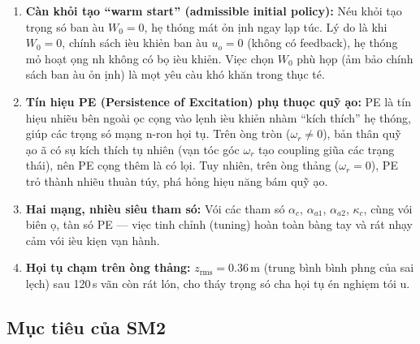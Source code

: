 \documentclass[12pt,a4paper]{article}
\begin{document}
\begin{enumerate}
    \item \textbf{C\`{a}n kh\h{o}i t\d{a}o ``warm start'' (admissible initial policy):} N\'{e}u kh\h{o}i t\d{a}o tr\d{o}ng s\'{o} ban \dj\`{a}u $W_0 = 0$, h\d{e} th\'{o}ng m\'{a}t \h{o}n \dj\d{i}nh ngay l\d{a}p t\'{u}c. L\'{y} do l\`{a} khi $W_0 = 0$, ch\'{i}nh s\'{a}ch \dj i\`{e}u khi\h{e}n ban \dj\`{a}u $u_o = 0$ (kh\^{o}ng c\'{o} feedback), h\d{e} th\'{o}ng m\h{o} ho\d{a}t \dj\d{o}ng nh\uhorn{} kh\^{o}ng c\'{o} b\d{o} \dj i\`{e}u khi\h{e}n. Vi\d{e}c ch\d{o}n $W_0$ ph\`{u} h\d{o}p (\dj\h{a}m b\h{a}o ch\'{i}nh s\'{a}ch ban \dj\`{a}u \h{o}n \dj\d{i}nh) l\`{a} m\d{o}t y\^{e}u c\`{a}u kh\'{o} kh\u{a}n trong th\d{u}c t\'{e}.

    \item \textbf{T\'{i}n hi\d{e}u PE (Persistence of Excitation) ph\d{u} thu\d{o}c qu\~{y} \dj\d{a}o:} PE l\`{a} t\'{i}n hi\d{e}u nhi\~{e}u b\^{e}n ngo\`{a}i \dj\uhorn{}\d{o}c c\d{o}ng v\`{a}o l\d{e}nh \dj i\`{e}u khi\h{e}n nh\`{a}m ``k\'{i}ch th\'{i}ch'' h\d{e} th\'{o}ng, gi\'{u}p c\'{a}c tr\d{o}ng s\'{o} m\d{a}ng n\ohorn{}-ron h\d{o}i t\d{u}. Tr\^{e}n \dj\uhorn{}\`{o}ng tr\`{o}n ($\omega_r \neq 0$), b\h{a}n th\^{a}n qu\~{y} \dj\d{a}o \dj\~{a} c\'{o} s\d{u} k\'{i}ch th\'{i}ch t\d{u} nhi\^{e}n (v\d{a}n t\'{o}c g\'{o}c $\omega_r$ t\d{a}o coupling gi\~{u}a c\'{a}c tr\d{a}ng th\'{a}i), n\^{e}n PE c\d{o}ng th\^{e}m l\`{a} c\'{o} l\d{o}i. Tuy nhi\^{e}n, tr\^{e}n \dj\uhorn{}\`{o}ng th\h{a}ng ($\omega_r = 0$), PE tr\h{o} th\`{a}nh nhi\~{e}u thu\`{a}n t\'{u}y, ph\'{a} h\h{o}ng hi\d{e}u n\u{a}ng b\'{a}m qu\~{y} \dj\d{a}o.

    \item \textbf{Hai m\d{a}ng, nhi\`{e}u si\^{e}u tham s\'{o}:} V\'{o}i c\'{a}c tham s\'{o} $\alpha_c$, $\alpha_{a1}$, $\alpha_{a2}$, $\kappa_c$, c\`{u}ng v\'{o}i bi\^{e}n \dj\d{o}, t\`{a}n s\'{o} PE --- vi\d{e}c tinh ch\h{i}nh (tuning) ho\`{a}n to\`{a}n b\`{a}ng tay v\`{a} r\'{a}t nh\d{a}y c\h{a}m v\'{o}i \dj i\`{e}u ki\d{e}n v\d{a}n h\`{a}nh.

    \item \textbf{H\d{o}i t\d{u} ch\d{a}m tr\^{e}n \dj\uhorn{}\`{o}ng th\h{a}ng:} $z_\text{rms} = 0.36$\,m (trung b\`{i}nh b\`{i}nh ph\uhorn{}\ohorn{}ng c\h{u}a sai l\d{e}ch) sau 120\,s v\~{a}n c\`{o}n r\'{a}t l\'{o}n, cho th\'{a}y tr\d{o}ng s\'{o} ch\uhorn{}a h\d{o}i t\d{u} \dj\'{e}n nghi\d{e}m t\'{o}i \uhorn{}u.
\end{enumerate}

\subsection{M\d{u}c ti\^{e}u c\h{u}a SM2}
\end{document}
